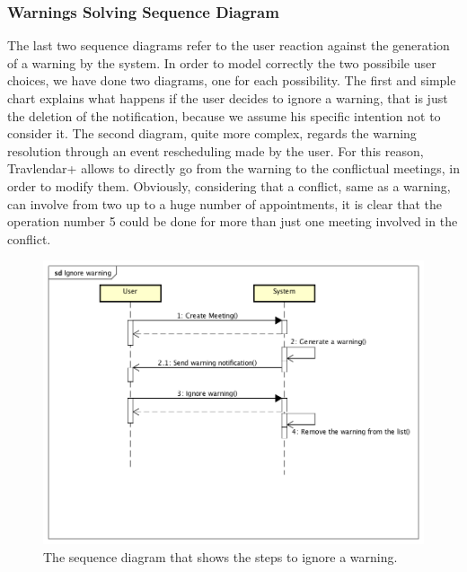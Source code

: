 \subsubsection{Warnings Solving Sequence Diagram}

The last two sequence diagrams refer to the user reaction against the generation of a warning by the system. 
In order to model correctly the two possibile user choices, we have done two diagrams, one for each possibility. 
The first and simple chart explains what happens if the user decides to ignore a warning, that is just the deletion of the notification, because we assume his specific intention not to consider it. 
The second diagram, quite more complex, regards the warning resolution through an event rescheduling made by the user. For this reason, Travlendar+ allows to directly go from the warning to the conflictual meetings, in order to modify them. 
Obviously, considering that a conflict, same as a warning, can involve from two up to a huge number of appointments, it is clear that the operation number 5 could be done for more than just one meeting involved in the conflict. 

\begin{figure}[htp]
	\centering
	\includegraphics[width=\textwidth]{sequencediagrams/Ignorewarning}
	\caption{The sequence diagram that shows the steps to ignore a warning.}
	\label{fig:ignorewarning}
\end{figure}


